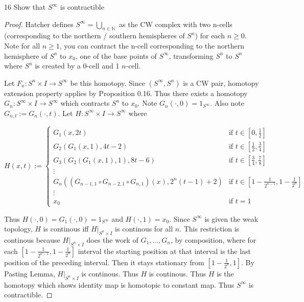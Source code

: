 \documentclass{article}
\newcommand{\N}{\mathbb{N}}
\begin{document}
\pagebreak

\begin{claim}{16}\label{Claim 16.}
    Show that $S^\infty$ is contractible
\end{claim}
\begin{proof}

    Hatcher defines $S^{\infty} = \bigcup_{n \in \N}$ as the CW complex with two n-cells (corresponding to the northern / southern hemispheres of $S^n$) for each $n \geq 0$. Note for all $n \geq 1$, you can contract the n-cell corresponding to the northern hemisphere of $S^n$ to $x_0$, one of the base points of $S^\infty$, transforming $S^n$ to $S^n$ where $S^n$ is created by a 0-cell and 1 $n$-cell.
    
    Let $F_n: S^n \times I \to S^\infty$ be this homotopy. Since $(S^\infty, S^n)$ is a CW pair, homotopy extension property applies by Proposition 0.16. Thus there exists a homotopy $G_n: S^\infty \times I \to S^\infty$ which contracts $S^n$ to $x_0$. Note $G_n(\cdot, 0) = 1_{S^\infty}$. Also note $G_{n, t} := G_n(\cdot, t)$.   Let $H: S^\infty \times I \to S^\infty$ where 
    
    \begin{equation*}
        H(x, t) := \begin{cases*}
            G_1(x, 2t) & \text{if $t \in [0, \frac{1}{2}]$ } \\
            G_2(G_1(x, 1), 4t - 2) & \text{if $t \in [\frac{1}{2}, \frac{3}{4}]$ } \\
            G_3(G_2(G_1(x, 1), 1), 8t - 6) & \text{if $t \in [\frac{3}{4}, \frac{7}{8}]$ } \\
            \vdots \\
            G_{n}((G_{n - 1, 1} \circ G_{n - 2, 1} \circ G_{n, 1})(x), 2^n(t - 1) + 2) & \text{if $t \in \left[1 - \frac{1}{2^{n - 1}}, 1 - \frac{1}{2^n}\right]$ } \\
            \vdots \\
            x_0 & \text{if $t = 1$}
        \end{cases*}
    \end{equation*}

    Thus $H(\cdot, 0) = G_1(\cdot, 0) = 1_{S^{\infty}}$ and $H(\cdot, 1) = x_0$. Since $S^\infty$ is given the weak topology, $H$ is continous iff $H|_{S^n \times I}$ is continous for all $n$. This restriction is continous because $H|_{S^n \times I}$ does the work of $G_1, \dots, G_n$, by composition, where for each $[1 - \frac{1}{2^{n - 1}}, 1 - \frac{1}{2^n}]$ interval the starting position at that interval is the last position of the preceding interval. Then it stays stationary from $[1 - \frac{1}{2^n}, 1]$. By Pasting Lemma, $H|_{S^n \times I}$ is continous. Thus $H$ is continous. Thus $H$ is the homotopy which shows identity map is homotopic to constant map. Thus $S^\infty$ is contractible.                   


\end{proof}
\end{document}
